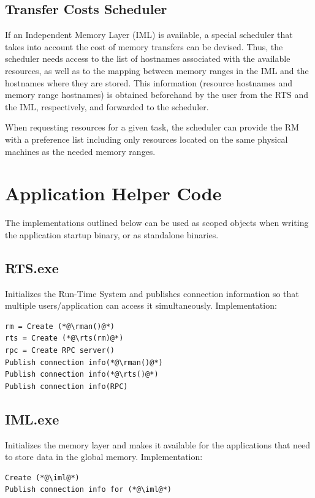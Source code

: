 \documentclass[10pt]{article}
\newcommand{\rts}{RTS\xspace}
\newcommand{\rman}{RM\xspace}
\newcommand{\iml}{IML\xspace}
\begin{document}
\subsection{Transfer Costs Scheduler}
If an Independent Memory Layer (IML) is available, a special scheduler that
takes into account the cost of memory transfers can be devised.
Thus, the scheduler needs access to the list of hostnames associated with the
available resources, as well as to the mapping between memory ranges in the IML
and the hostnames where they are stored. This information (resource hostnames 
and memory range hostnames) is obtained beforehand by the user from the \rts 
and the \iml, respectively, and forwarded to the scheduler.

When requesting resources for a given task, the scheduler can provide the RM
with a preference list including only resources located on the same physical
machines as the needed memory ranges.


\section{Application Helper Code}
The implementations outlined below can be used as scoped objects when writing 
the application startup binary, or as standalone binaries.

\subsection{RTS.exe}
Initializes the Run-Time System and publishes connection information so that 
multiple users/application can access it simultaneously.
Implementation:
\begin{lstlisting}
rm = Create (*@\rman()@*)
rts = Create (*@\rts(rm)@*)
rpc = Create RPC server()
Publish connection info(*@\rman()@*)
Publish connection info(*@\rts()@*)
Publish connection info(RPC)
\end{lstlisting}



\subsection{IML.exe}
Initializes the memory layer and makes it available for the applications that 
need to store data in the global memory.
Implementation:
\begin{lstlisting}
Create (*@\iml@*)
Publish connection info for (*@\iml@*)
\end{lstlisting}
\end{document}
